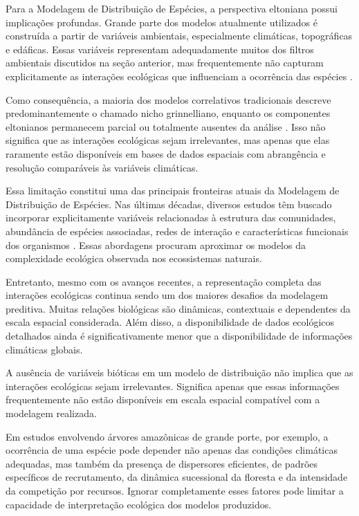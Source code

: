 Para a Modelagem de Distribuição de Espécies, a perspectiva eltoniana possui implicações profundas. Grande parte dos modelos atualmente utilizados é construída a partir de variáveis ambientais, especialmente climáticas, topográficas e edáficas. Essas variáveis representam adequadamente muitos dos filtros ambientais discutidos na seção anterior, mas frequentemente não capturam explicitamente as interações ecológicas que influenciam a ocorrência das espécies \parencite{guisan2005predicting,elith2009}.

Como consequência, a maioria dos modelos correlativos tradicionais descreve predominantemente o chamado nicho grinnelliano, enquanto os componentes eltonianos permanecem parcial ou totalmente ausentes da análise \parencite{soberon2007}. Isso não significa que as interações ecológicas sejam irrelevantes, mas apenas que elas raramente estão disponíveis em bases de dados espaciais com abrangência e resolução comparáveis às variáveis climáticas.

Essa limitação constitui uma das principais fronteiras atuais da Modelagem de Distribuição de Espécies. Nas últimas décadas, diversos estudos têm buscado incorporar explicitamente variáveis relacionadas à estrutura das comunidades, abundância de espécies associadas, redes de interação e características funcionais dos organismos \parencite{wisz2013,kissling2012}. Essas abordagens procuram aproximar os modelos da complexidade ecológica observada nos ecossistemas naturais.

Entretanto, mesmo com os avanços recentes, a representação completa das interações ecológicas continua sendo um dos maiores desafios da modelagem preditiva. Muitas relações biológicas são dinâmicas, contextuais e dependentes da escala espacial considerada. Além disso, a disponibilidade de dados ecológicos detalhados ainda é significativamente menor que a disponibilidade de informações climáticas globais.

\begin{atencao}
	A ausência de variáveis bióticas em um modelo de distribuição não implica que as interações ecológicas sejam irrelevantes. Significa apenas que essas informações frequentemente não estão disponíveis em escala espacial compatível com a modelagem realizada.
\end{atencao}

Em estudos envolvendo árvores amazônicas de grande porte, por exemplo, a ocorrência de uma espécie pode depender não apenas das condições climáticas adequadas, mas também da presença de dispersores eficientes, de padrões específicos de recrutamento, da dinâmica sucessional da floresta e da intensidade da competição por recursos. Ignorar completamente esses fatores pode limitar a capacidade de interpretação ecológica dos modelos produzidos.


